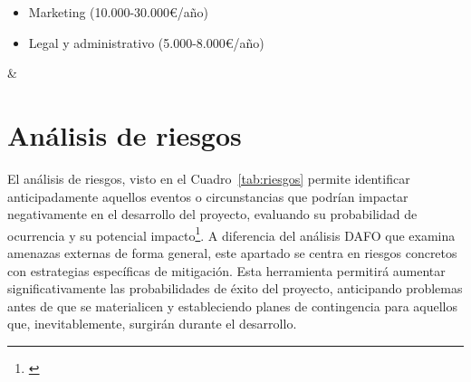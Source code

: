 \begin{table}[!htb]
{\begin{tabular}
{\begin{minipage}[t]{\dimexpr 8.4cm + 4\tabcolsep + 2\arrayrulewidth\relax}
\begin{itemize}[leftmargin=*,noitemsep,topsep=0pt,itemsep=3pt]
            \item Marketing (10.000-30.000€/año)
            \item Legal y administrativo (5.000-8.000€/año)
        \end{itemize}
        \vspace{0.15cm}
    \end{minipage}%
} & 
 \\
\hline
\end{tabular}
}
\end{table}


\section{Análisis de riesgos} 

El análisis de riesgos, visto en el Cuadro~\ref{tab:riesgos} permite identificar anticipadamente aquellos eventos o circunstancias que podrían impactar negativamente en el desarrollo del proyecto, evaluando su probabilidad de ocurrencia y su potencial impacto\footnote{\cite{pmi2017pmbok}}. A diferencia del análisis DAFO que examina amenazas externas de forma general, este apartado se centra en riesgos concretos con estrategias específicas de mitigación. Esta herramienta permitirá aumentar significativamente las probabilidades de éxito del proyecto, anticipando problemas antes de que se materialicen y estableciendo planes de contingencia para aquellos que, inevitablemente, surgirán durante el desarrollo.

